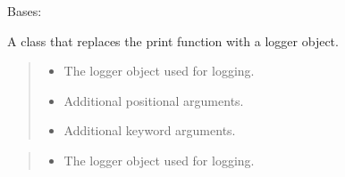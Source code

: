 \documentclass[a4paper,11pt,english,openany]{sphinxmanual}
\begin{document}
\begin{fulllineitems}
\label{\detokenize{api/spyice.utils.spyice_logger:spyice.utils.spyice_logger.SpyiceLogger}}
\pysigstartsignatures
{}
\pysigstopsignatures
\sphinxAtStartPar
Bases: 

\sphinxAtStartPar
A class that replaces the print function with a logger object.
\begin{quote}\begin{description}
\begin{itemize}
\item {} 
\sphinxAtStartPar
{} \textendash{} The logger object used for logging.

\item {} 
\sphinxAtStartPar
{} \textendash{} Additional positional arguments.

\item {} 
\sphinxAtStartPar
{} \textendash{} Additional keyword arguments.

\end{itemize}

\end{description}\end{quote}

\begin{fulllineitems}
\label{\detokenize{api/spyice.utils.spyice_logger:spyice.utils.spyice_logger.SpyiceLogger.__init__}}
\pysigstartsignatures
{}
\pysigstopsignatures\begin{quote}\begin{description}
\begin{itemize}
\item {} 
\sphinxAtStartPar
{} \textendash{} The logger object used for logging.


\end{itemize}
\end{description}
\end{quote}
\end{fulllineitems}
\end{fulllineitems}
\end{document}
